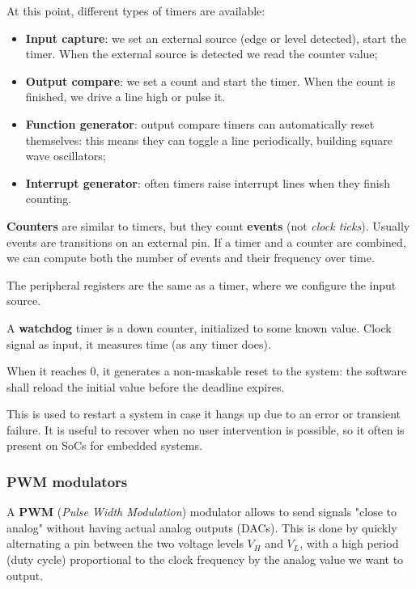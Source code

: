 \documentclass[a4paper,11pt]{article}
\begin{document}
At this point, different types of timers are available:

\begin{itemize}
	\item \textbf{Input capture}: we set an external source (edge or level detected), start the timer. When the external source is detected we read the counter value; 
	\item \textbf{Output compare}: we set a count and start the timer. When the count is finished, we drive a line high or pulse it.
	\item \textbf{Function generator}: output compare timers can automatically reset themselves: this means they can toggle a line periodically, building square wave oscillators;
	\item \textbf{Interrupt generator}: often timers raise interrupt lines when they finish counting. 
\end{itemize}

\par\smallskip

\textbf{Counters} are similar to timers, but they count \textbf{events} (not \textit{clock ticks}).
Usually events are transitions on an external pin.
If a timer and a counter are combined, we can compute both the number of events and their frequency over time.

The peripheral registers are the same as a timer, where we configure the input source.

\par\smallskip

A \textbf{watchdog} timer is a down counter, initialized to some known value.
Clock signal as input, it measures time (as any timer does).

When it reaches 0, it generates a non-maskable reset to the system: the software shall reload the initial value before the deadline expires.

This is used to restart a system in case it hangs up due to an error or transient failure.
It is useful to recover when no user intervention is possible, so it often is present on SoCs for embedded systems.

\subsubsection{PWM modulators}

A \textbf{PWM} (\textit{Pulse Width Modulation}) modulator allows to send signals "close to analog" without having actual analog outputs (DACs).
This is done by quickly alternating a pin between the two voltage levels $V_H$ and $V_L$, with a high period (duty cycle) proportional to the clock frequency by the analog value we want to output.
\end{document}
